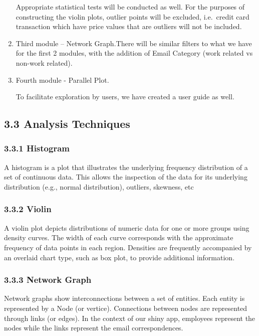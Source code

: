 \documentclass[
]{article}
\begin{document}
\begin{enumerate}
  Appropriate statistical tests will be conducted as well. For the purposes of constructing the violin plots, outlier points will be excluded, i.e.~credit card transaction which have price values that are outliers will not be included.
\item
  Third module -- Network Graph.There will be similar filters to what we have for the first 2 modules, with the addition of Email Category (work related vs non-work related).
\item
  Fourth module - Parallel Plot.

  To facilitate exploration by users, we have created a user guide as well.
\end{enumerate}

\hypertarget{analysis-techniques}{%
\subsection{3.3 Analysis Techniques}\label{analysis-techniques}}

\hypertarget{histogram}{%
\subsubsection{3.3.1 Histogram}\label{histogram}}

A histogram is a plot that illustrates the underlying frequency distribution of a set of continuous data. This allows the inspection of the data for its underlying distribution (e.g., normal distribution), outliers, skewness, etc

\hypertarget{violin}{%
\subsubsection{3.3.2 Violin}\label{violin}}

A violin plot depicts distributions of numeric data for one or more groups using density curves. The width of each curve corresponds with the approximate frequency of data points in each region. Densities are frequently accompanied by an overlaid chart type, such as box plot, to provide additional information.

\hypertarget{network-graph}{%
\subsubsection{3.3.3 Network Graph}\label{network-graph}}

Network graphs show interconnections between a set of entities. Each entity is represented by a Node (or vertice). Connections between nodes are represented through links (or edges). In the context of our shiny app, employees represent the nodes while the links represent the email correspondences.
\end{document}

